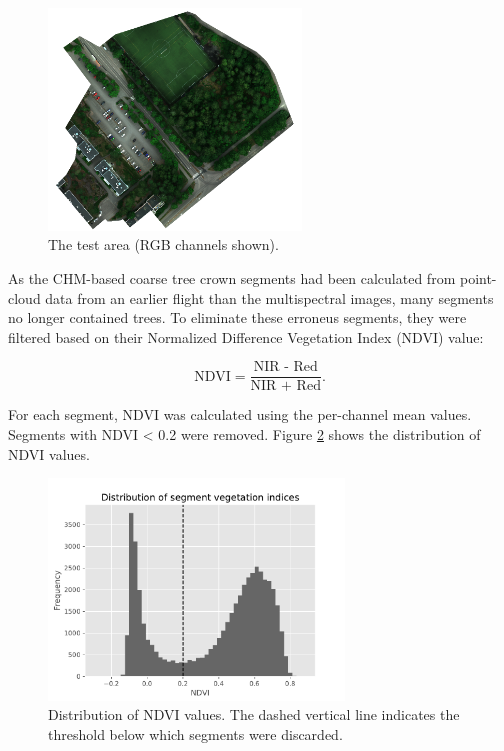 \documentclass[english, 12pt, a4paper, sci, utf8, a-2b, online]{aaltothesis}
\begin{document}
\begin{figure}[h]
    \centering
    \includegraphics[width=0.6\textwidth]{figures/dataset-test.png}
    \caption{The test area (RGB channels shown).}
    \label{fig:dataset-test}
\end{figure}

As the CHM-based coarse tree crown segments had been calculated from point-cloud data from an earlier flight than the multispectral images, many segments no longer contained trees. To eliminate these erroneus segments, they were filtered based on their Normalized Difference Vegetation Index (NDVI) value:

\begin{equation}
\text{NDVI} = \frac{\text{NIR - Red}}{\text{NIR + Red}}.
\end{equation}

For each segment, NDVI was calculated using the per-channel mean values. Segments with NDVI < 0.2 were removed. Figure \ref{fig:ndvi} shows the distribution of NDVI values.

\begin{figure}[h]
    \centering
    \includegraphics[width=0.7\textwidth]{figures/ndvi.pdf}
    \caption{Distribution of NDVI values. The dashed vertical line indicates the threshold below which segments were discarded.}
    \label{fig:ndvi}
\end{figure}
\end{document}
